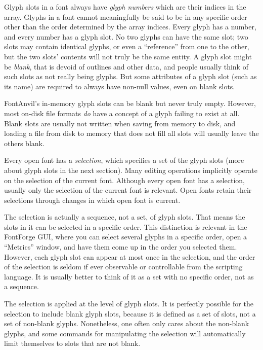 \documentclass[11pt]{report}
\begin{document}
Glyph slots in a font always have \emph{glyph numbers} which are their
indices in the array.  Glyphs in a font cannot meaningfully be said to be in
any specific order other than the order determined by the array indices. 
Every glyph has a number, and every number has a glyph slot.  No two glyphs
can have the same slot; two slots may contain identical glyphs, or even a
``reference'' from one to the other, but the two slots' contents will not
truly be the same entity.  A glyph slot might be \emph{blank}, that is
devoid of outlines and other data, and people usually think of such slots as
not really being glyphs.  But some attributes of a glyph slot (such as its
name) are required to always have non-null values, even on blank slots.

\begin{framed}
FontAnvil's in-memory glyph slots can be blank but never truly empty. 
However, most on-disk file formats \emph{do} have a concept of a glyph
failing to exist at all.  Blank slots are usually not written when saving
from memory to disk, and loading a file from disk to memory that does not
fill all slots will usually leave the others blank.
\end{framed}

Every open font has a \emph{selection}, which specifies a set of the glyph
slots (more about glyph slots in the next section).  Many editing operations
implicitly operate on the selection of the current font.  Although every
open font has a selection, usually only the selection of the current font is
relevant.  Open fonts retain their selections through changes in which open
font is current.

The selection is actually a sequence, not a set, of glyph slots.  That means
the slots in it can be selected in a specific order.  This distinction is
relevant in the FontForge GUI, where you can select several glyphs in a
specific order, open a ``Metrics'' window, and have them come up in the
order you selected them.  However, each glyph slot can appear at most once
in the selection, and the order of the selection is seldom if ever
observable or controllable from the scripting language.  It is usually
better to think of it as a set with no specific order, not as a sequence.

The selection is applied at the level of glyph slots.  It is perfectly
possible for the selection to include blank glyph slots, because it is
defined as a set of slots, not a set of non-blank glyphs.  Nonetheless, one
often only cares about the non-blank glyphs, and some commands for
manipulating the selection will automatically limit themselves to slots that
are not blank.
\end{document}

